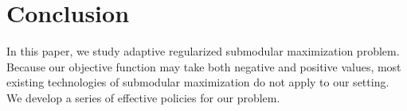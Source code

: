 \documentclass[twoside,leqno,twocolumn]{article}
\begin{document}
\section{Conclusion}
In this paper, we study adaptive regularized submodular maximization problem. Because our objective function may take both negative and positive values, most existing technologies of submodular maximization do not apply to our setting. We develop a series of effective policies for our problem.


\end{document}
